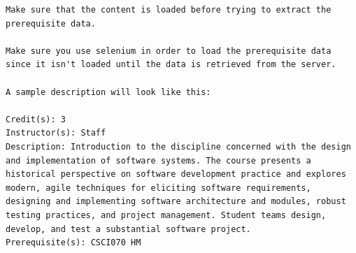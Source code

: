 \documentclass[12pt]{article}
\begin{document}
\begin{lstlisting}
Make sure that the content is loaded before trying to extract the prerequisite data. 

Make sure you use selenium in order to load the prerequisite data since it isn't loaded until the data is retrieved from the server.

A sample description will look like this:

Credit(s): 3
Instructor(s): Staff
Description: Introduction to the discipline concerned with the design and implementation of software systems. The course presents a historical perspective on software development practice and explores modern, agile techniques for eliciting software requirements, designing and implementing software architecture and modules, robust testing practices, and project management. Student teams design, develop, and test a substantial software project.
Prerequisite(s): CSCI070 HM 

\end{lstlisting}
\end{document}
